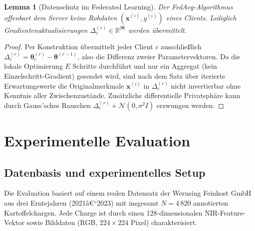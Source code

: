 ﻿\documentclass[12pt,a4paper]{article}
\theoremstyle{plain}
\newtheorem{lemma}[theorem]{Lemma}
\theoremstyle{definition}
\begin{document}
	\begin{lemma}[Datenschutz im Federated Learning]
		\label{lem:privacy}
		Der FedAvg-Algorithmus offenbart dem Server keine Rohdaten
		$(\mathbf{x}^{(i)}, y^{(i)})$ eines Clients. Lediglich Gradientenaktualisierungen
		$\Delta_c^{(r)} \in \mathbb{R}^{|\boldsymbol{\theta}|}$ werden übermittelt.
	\end{lemma}
	
	\begin{proof}
		Per Konstruktion übermittelt jeder Client $c$ ausschließlich
		$\Delta_c^{(r)} = \boldsymbol{\theta}_c^{(r)} - \boldsymbol{\theta}^{(r-1)}$,
		also die Differenz zweier Parametervektoren. Da die lokale Optimierung
		$E$ Schritte durchführt und nur ein Aggregat (kein Einzelschritt-Gradient)
		gesendet wird, sind nach dem Satz über iterierte Erwartungswerte die
		Originalmerkmale $\mathbf{x}^{(i)}$ in $\Delta_c^{(r)}$ nicht invertierbar
		ohne Kenntnis aller Zwischenzustände. Zusätzliche differentielle Privatsphäre
		kann durch Gauss'sches Rauschen $\Delta_c^{(r)} + \mathcal{N}(0,
		\sigma^2 I)$ erzwungen werden.
	\end{proof}
	
	\section{Experimentelle Evaluation}
	
	\subsection{Datenbasis und experimentelles Setup}
	
	Die Evaluation basiert auf einem realen Datensatz der Wernsing Feinkost GmbH
	aus drei Erntejahren (2021â€“2023) mit insgesamt $N = 4\,820$ annotierten
	Kartoffelchargen. Jede Charge ist durch einen 128-dimensionalen NIR-Feature-Vektor
	sowie Bilddaten (RGB, $224 \times 224$ Pixel) charakterisiert.
	
\end{document}
